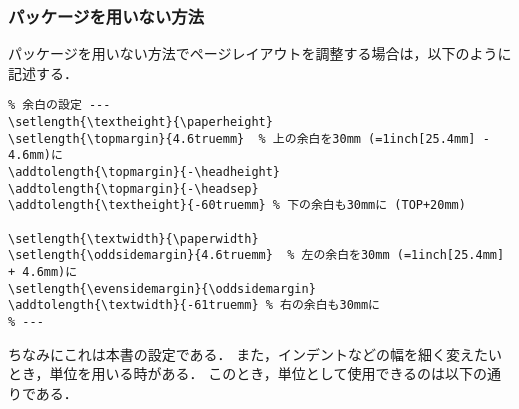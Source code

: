 \subsubsection{パッケージを用いない方法}
パッケージを用いない方法でページレイアウトを調整する場合は，以下のように記述する．
\begin{lstlisting}
% 余白の設定 ---
\setlength{\textheight}{\paperheight}
\setlength{\topmargin}{4.6truemm}  % 上の余白を30mm (=1inch[25.4mm] - 4.6mm)に
\addtolength{\topmargin}{-\headheight}
\addtolength{\topmargin}{-\headsep}
\addtolength{\textheight}{-60truemm} % 下の余白も30mmに (TOP+20mm)

\setlength{\textwidth}{\paperwidth}
\setlength{\oddsidemargin}{4.6truemm}  % 左の余白を30mm (=1inch[25.4mm] + 4.6mm)に
\setlength{\evensidemargin}{\oddsidemargin}
\addtolength{\textwidth}{-61truemm} % 右の余白も30mmに
% ---
\end{lstlisting}
ちなみにこれは本書の設定である．
また，インデントなどの幅を細く変えたいとき，単位を用いる時がある．
このとき，単位として使用できるのは以下の通りである．
